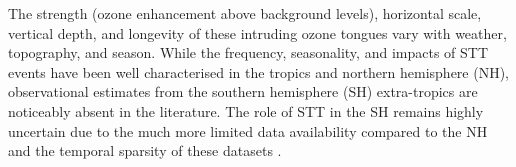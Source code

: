 The strength (ozone enhancement above background levels), horizontal scale, vertical depth, and longevity of these intruding ozone tongues vary with weather, topography, and season.
While the frequency, seasonality, and impacts of STT events have been well characterised in the tropics and northern hemisphere (NH), observational estimates from the southern hemisphere (SH) extra-tropics are noticeably absent in the literature. 
The role of STT in the SH remains highly uncertain due to the much more limited data availability compared to the NH and the temporal sparsity of these datasets \citep{Liu2015, Thompson2014, Mze2010}. 



